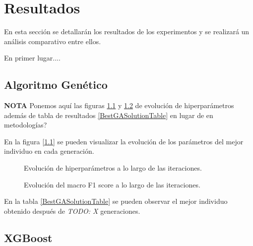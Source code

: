 
\chapter{Resultados}
\label{resultados}



  En esta sección se detallarán los resultados de los experimentos y se realizará un análisis comparativo entre ellos.


  En primer lugar....

\section{Algoritmo Genético}

  \textbf{NOTA} Ponemos aquí las figuras \ref{EvolucionHiperparametrosImage} y \ref{EvolucionF1ScoreImage} de evolución de hiperparámetros además de tabla de resultados \ref{BestGASolutionTable} en lugar de en metodologías?

  En la figura [\ref{EvolucionHiperparametrosImage}] se pueden visualizar la evolución de los parámetros del mejor individuo en cada generación.

  \begin{figure}[H]
      \centering
      
      \caption{Evolución de hiperparámetros a lo largo de las iteraciones.}
      \label{EvolucionHiperparametrosImage}
   \end{figure}

  \begin{figure}[H]
      \centering
      
      \caption{Evolución del macro F1 score a lo largo de las iteraciones.}
      \label{EvolucionF1ScoreImage}
   \end{figure}
   
  En la tabla \ref{BestGASolutionTable} se pueden observar el mejor individuo obtenido después de \textit{TODO: X} generaciones.

\section{XGBoost}

